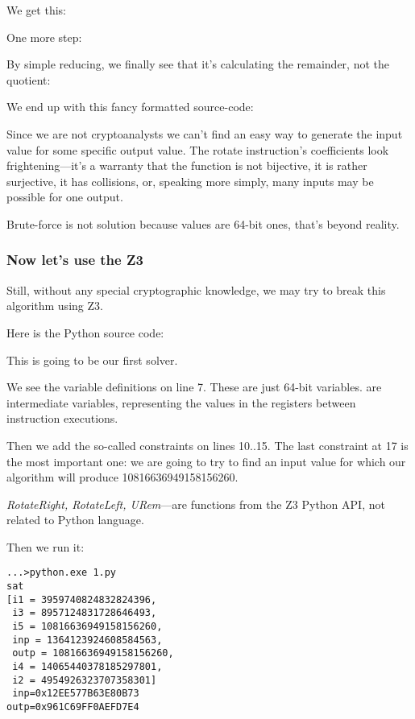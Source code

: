 We get this:



One more step:



By simple reducing, we finally see that it's calculating the remainder, not the quotient:



We end up with this fancy formatted source-code:



Since we are not cryptoanalysts we can't find an easy way to generate the input value for some specific output value.
The rotate instruction's coefficients look frightening---it's a warranty that the function is not bijective,
it is rather surjective, 
it has collisions, or, speaking more simply, many inputs may be possible for one output.

Brute-force is not solution because values are 64-bit ones, that's beyond reality.

\subsubsection{Now let's use the Z3}

Still, without any special cryptographic knowledge, we may try to break this algorithm using Z3.

Here is the Python source code:



This is going to be our first solver.

We see the variable definitions on line 7.
These are just 64-bit variables.
 are intermediate variables, representing the values in the registers between instruction executions.

Then we add the so-called constraints on lines 10..15.
The last constraint at 17 is the most important one: 
we are going to try to find an input value for which our algorithm will produce 10816636949158156260.

\textit{RotateRight, RotateLeft, URem}---are functions from the Z3 Python API, not related to Python language.

Then we run it:

\begin{lstlisting}
...>python.exe 1.py
sat
[i1 = 3959740824832824396,
 i3 = 8957124831728646493,
 i5 = 10816636949158156260,
 inp = 1364123924608584563,
 outp = 10816636949158156260,
 i4 = 14065440378185297801,
 i2 = 4954926323707358301]
 inp=0x12EE577B63E80B73
outp=0x961C69FF0AEFD7E4
\end{lstlisting}

